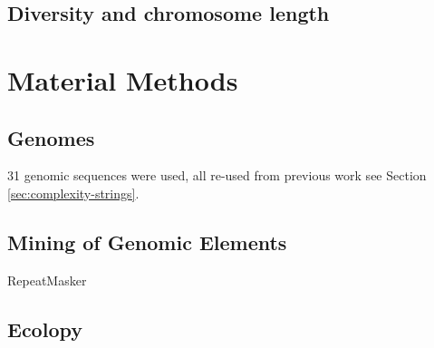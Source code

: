 \subsection{Diversity and chromosome length}

\section{Material Methods}

\subsection{Genomes}

31 genomic sequences were used, all re-used from previous work see Section \ref{sec:complexity-strings}.

\subsection{Mining of Genomic Elements}

RepeatMasker

\subsection{Ecolopy}


